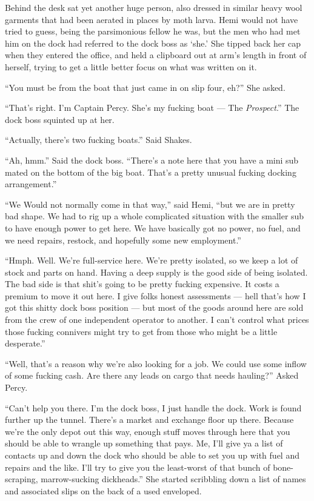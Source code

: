 \documentclass[
]{scrbook}
\begin{document}
Behind the desk sat yet another huge person, also dressed in similar
heavy wool garments that had been aerated in places by moth larva. Hemi
would not have tried to guess, being the parsimonious fellow he was, but
the men who had met him on the dock had referred to the dock boss as
`she.' She tipped back her cap when they entered the office, and held a
clipboard out at arm's length in front of herself, trying to get a
little better focus on what was written on it.

``You must be from the boat that just came in on slip four, eh?'' She
asked.

``That's right. I'm Captain Percy. She's my fucking boat --- The
\emph{Prospect}.'' The dock boss squinted up at her.

``Actually, there's two fucking boats.'' Said Shakes.

``Ah, hmm.'' Said the dock boss. ``There's a note here that you have a
mini sub mated on the bottom of the big boat. That's a pretty unusual
fucking docking arrangement.''

``We Would not normally come in that way,'' said Hemi, ``but we are in
pretty bad shape. We had to rig up a whole complicated situation with
the smaller sub to have enough power to get here. We have basically got
no power, no fuel, and we need repairs, restock, and hopefully some new
employment.''

``Hmph. Well. We're full-service here. We're pretty isolated, so we keep
a lot of stock and parts on hand. Having a deep supply is the good side
of being isolated. The bad side is that shit's going to be pretty
fucking expensive. It costs a premium to move it out here. I give folks
honest assessments --- hell that's how I got this shitty dock boss
position --- but most of the goods around here are sold from the crew of
one independent operator to another. I can't control what prices those
fucking connivers might try to get from those who might be a little
desperate.''

``Well, that's a reason why we're also looking for a job. We could use
some inflow of some fucking cash. Are there any leads on cargo that
needs hauling?'' Asked Percy.

``Can't help you there. I'm the dock boss, I just handle the dock. Work
is found further up the tunnel. There's a market and exchange floor up
there. Because we're the only depot out this way, enough stuff moves
through here that you should be able to wrangle up something that pays.
Me, I'll give ya a list of contacts up and down the dock who should be
able to set you up with fuel and repairs and the like. I'll try to give
you the least-worst of that bunch of bone-scraping, marrow-sucking
dickheads.'' She started scribbling down a list of names and associated
slips on the back of a used enveloped.
\end{document}
